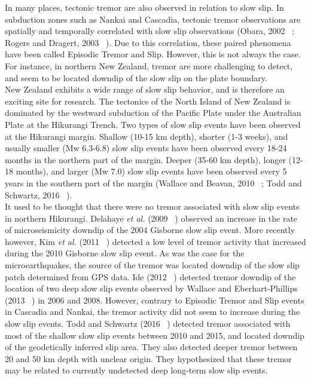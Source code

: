 \documentclass[letterpaper, 12pt]{article}
\begin{document}
In many places, tectonic tremor are also observed in relation to slow slip. In subduction zones such as Nankai and Cascadia, tectonic tremor observations are spatially and temporally correlated with slow slip observations (Obara, 2002 ~\cite{OBA_2002}; Rogers and Dragert, 2003 ~\cite{ROG_2003}). Due to this correlation, these paired phenomena have been called Episodic Tremor and Slip. However, this is not always the case. For instance, in northern New Zealand, tremor are more challenging to detect, and seem to be located downdip of the slow slip on the plate boundary. \\

New Zealand exhibits a wide range of slow slip behavior, and is therefore an exciting site for research. The tectonics of the North Island of New Zealand is dominated by the westward subduction of the Pacific Plate under the Australian Plate at the Hikurangi Trench. Two types of slow slip events have been observed at the Hikurangi margin. Shallow (10-15 km depth), shorter (1-3 weeks), and usually smaller (Mw 6.3-6.8) slow slip events have been observed every 18-24 months in the northern part of the margin. Deeper (35-60 km depth), longer (12-18 months), and larger (Mw 7.0) slow slip events have been observed every 5 years in the southern part of the margin (Wallace and Beavan, 2010 ~\cite{WAL_2010}; Todd and Schwartz, 2016 ~\cite{TOD_2016}).\\

It used to be thought that there were no tremor associated with slow slip events in northern Hikurangi. Delahaye \textit{et al.} (2009 ~\cite{DEL_2009}) observed an increase in the rate of microseismicity downdip of the 2004 Gisborne slow slip event. More recently however, Kim \textit{et al.} (2011 ~\cite{KIM_2011}) detected a low level of tremor activity that increased during the 2010 Gisborne slow slip event. As was the case for the microearthquakes, the source of the tremor was located downdip of the slow slip patch determined from GPS data. Ide (2012 ~\cite{IDE_2012}) detected tremor downdip of the location of two deep slow slip events observed by Wallace and Eberhart-Phillips (2013 ~\cite{WAL_2013}) in 2006 and 2008. However, contrary to Episodic Tremor and Slip events in Cascadia and Nankai, the tremor activity did not seem to increase during the slow slip events. Todd and Schwartz (2016 ~\cite{TOD_2016}) detected tremor associated with most of the shallow slow slip events between 2010 and 2015, and located downdip of the geodetically inferred slip area. They also detected deeper tremor between 20 and 50 km depth with unclear origin. They hypothesized that these tremor may be related to currently undetected deep long-term slow slip events.\\
\end{document}
